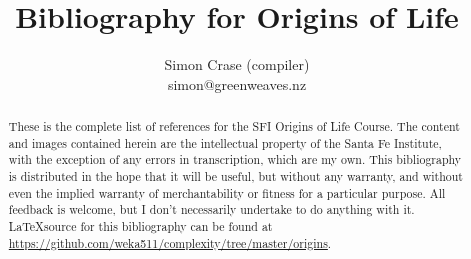 \documentclass[]{article}
\title{
	Bibliography for Origins of Life
}
\author{Simon Crase (compiler)\\simon@greenweaves.nz}
\begin{document}
\maketitle

\begin{abstract}
	These is the complete list of references for the SFI Origins of Life Course. 
	The content and images contained herein are the intellectual property of the Santa Fe Institute, with the exception of any errors in transcription, which are my own.
	This bibliography is distributed in the hope that it will be useful,
	but without any warranty, and without even the implied warranty of
	merchantability or fitness for a particular purpose. All feedback is welcome,
	but I don't necessarily undertake to do anything with it.\\
	\LaTeX source for this bibliography can be found at\\
	\url{https://github.com/weka511/complexity/tree/master/origins}.
\end{abstract}

\nocite{*}


\end{document}
